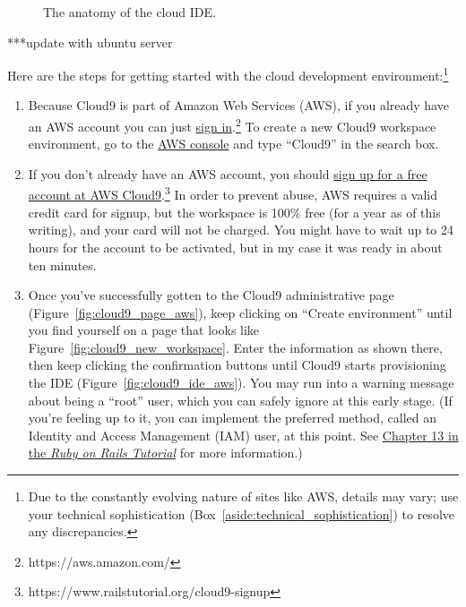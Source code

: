 \begin{figure}
\begin{center}
\end{center}
\caption{The anatomy of the cloud IDE.\label{fig:ide_anatomy}}
\end{figure}

***update with ubuntu server

Here are the steps for getting started with the cloud development environment:\footnote{Due to the constantly evolving nature of sites like AWS, details may vary; use your technical sophistication (Box~\ref{aside:technical_sophistication}) to resolve any discrepancies.}
\begin{enumerate}
\item Because Cloud9 is part of Amazon Web Services (AWS), if you already have an AWS account you can just \href{https://aws.amazon.com/}{sign in}.\footnote{https://aws.amazon.com/} To create a new Cloud9 workspace environment, go to the \href{https://console.aws.amazon.com/}{AWS console} and type ``Cloud9'' in the search box.
\item If you don't already have an AWS account, you should \href{https://www.railstutorial.org/cloud9-signup}{sign up for a free account at AWS Cloud9}.\footnote{https://www.railstutorial.org/cloud9-signup} In order to prevent abuse, AWS requires a valid credit card for signup, but the workspace is 100\% free (for a year as of this writing), and your card will not be charged. You might have to wait up to 24 hours for the account to be activated, but in my case it was ready in about ten minutes.
\item Once you've successfully gotten to the Cloud9 administrative page (Figure~\ref{fig:cloud9_page_aws}), keep clicking on ``Create environment'' until you find yourself on a page that looks like Figure~\ref{fig:cloud9_new_workspace}. Enter the information as shown there, then keep clicking the confirmation buttons until Cloud9 starts provisioning the IDE (Figure~\ref{fig:cloud9_ide_aws}). You may run into a warning message about being a ``root'' user, which you can safely ignore at this early stage. (If you're feeling up to it, you can implement the preferred method, called an Identity and Access Management (IAM) user, at this point. See \href{https://www.railstutorial.org/book/user_microposts#sec-image_upload_in_production}{Chapter 13 in the \href{https://www.railstutorial.org/}{\emph{Ruby on Rails Tutorial}}} for more information.)
\end{enumerate}

